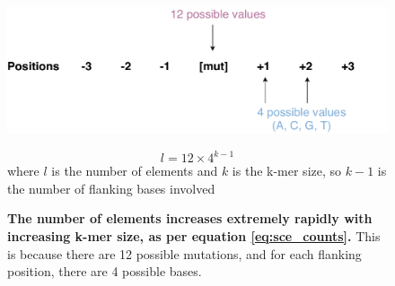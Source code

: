 \begin{figure}[h!]
  \begin{minipage}[c]{0.7\textwidth}
    \includegraphics[width=\textwidth]{graphics/sce_counts_demo.pdf}
  \end{minipage}\hfill
  \begin{minipage}[c]{0.3\textwidth}
    \begin{equation}
    l = 12 \times 4^{k-1}
    \label{eq:sce_counts}
    \end{equation}
    where $l$ is the number of elements and $k$ is the k-mer size, so $k-1$ is the number of flanking bases involved
  \end{minipage}\hfill
  
  \vspace{0.5cm}
  \begin{minipage}[c]{\textwidth}
    \caption{
      \textbf{The number of elements increases extremely rapidly with increasing k-mer size, as per equation \ref{eq:sce_counts}.} This is because there are 12 possible mutations, and for each flanking position, there are 4 possible bases. 
    } \label{fig:sce_counts}
  \end{minipage}
\end{figure}
